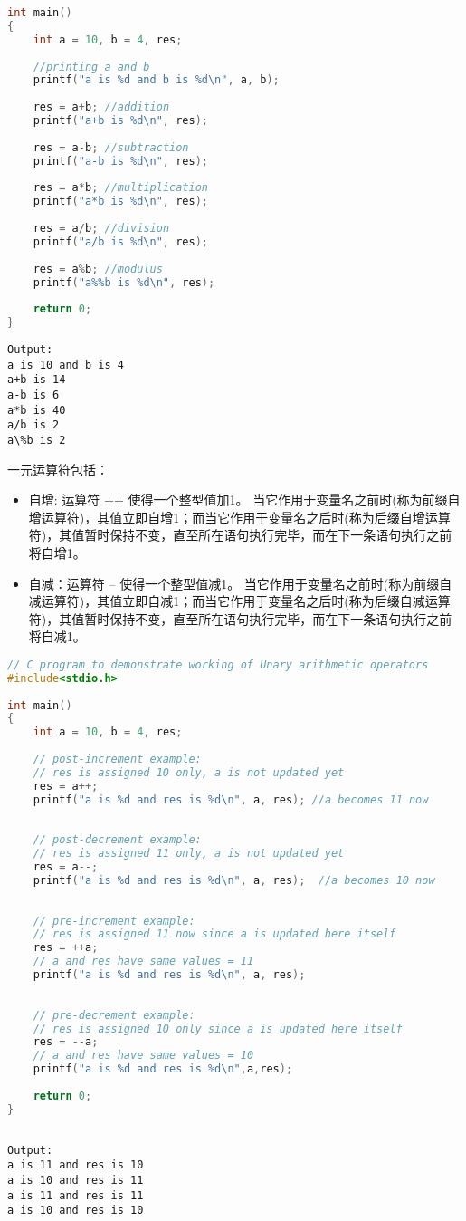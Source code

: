 \documentclass[10pt,a4paper%
tablecaptionabove]{article}
\def\tf{\ttfamily}
\begin{document}
\begin{CJK}{UTF8}{gkai}
\begin{lstlisting}[language=c,backgroundcolor=\color{red!10}]
int main()
{
    int a = 10, b = 4, res;
 
    //printing a and b
    printf("a is %d and b is %d\n", a, b);
 
    res = a+b; //addition
    printf("a+b is %d\n", res);
 
    res = a-b; //subtraction
    printf("a-b is %d\n", res);
 
    res = a*b; //multiplication
    printf("a*b is %d\n", res);
 
    res = a/b; //division
    printf("a/b is %d\n", res);
 
    res = a%b; //modulus
    printf("a%%b is %d\n", res);
 
    return 0;
}  
\end{lstlisting}
\begin{lstlisting}[backgroundcolor=\color{red!10}]
Output:
a is 10 and b is 4
a+b is 14
a-b is 6
a*b is 40
a/b is 2
a\%b is 2  
\end{lstlisting}
一元运算符包括：
\begin{itemize}
\item 自增: 运算符 {\tf ++} 使得一个整型值加1。 当它作用于变量名之前时(称为前缀自增运算符)，其值立即自增1；而当它作用于变量名之后时(称为后缀自增运算符)，其值暂时保持不变，直至所在语句执行完毕，而在下一条语句执行之前将自增1。
\item 自减：运算符 {\tf --} 使得一个整型值减1。 当它作用于变量名之前时(称为前缀自减运算符)，其值立即自减1；而当它作用于变量名之后时(称为后缀自减运算符)，其值暂时保持不变，直至所在语句执行完毕，而在下一条语句执行之前将自减1。
\end{itemize}
\begin{lstlisting}[language=c,backgroundcolor=\color{red!10}]
// C program to demonstrate working of Unary arithmetic operators
#include<stdio.h>
 
int main()
{
    int a = 10, b = 4, res;
 
    // post-increment example:
    // res is assigned 10 only, a is not updated yet
    res = a++;
    printf("a is %d and res is %d\n", a, res); //a becomes 11 now
 
 
    // post-decrement example:
    // res is assigned 11 only, a is not updated yet
    res = a--;
    printf("a is %d and res is %d\n", a, res);  //a becomes 10 now
 
 
    // pre-increment example:
    // res is assigned 11 now since a is updated here itself
    res = ++a;
    // a and res have same values = 11
    printf("a is %d and res is %d\n", a, res);
 
 
    // pre-decrement example:
    // res is assigned 10 only since a is updated here itself
    res = --a;
    // a and res have same values = 10
    printf("a is %d and res is %d\n",a,res); 
 
    return 0;
}
  
\end{lstlisting}
\begin{lstlisting}[backgroundcolor=\color{red!10}]
Output:
a is 11 and res is 10
a is 10 and res is 11
a is 11 and res is 11
a is 10 and res is 10  
\end{lstlisting}


\end{CJK}
\end{document}

